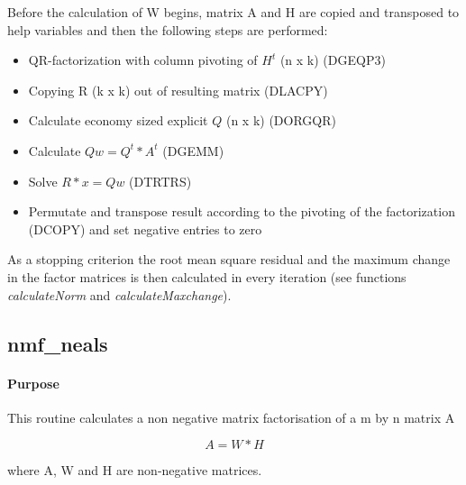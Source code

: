 \documentclass[a4paper,10pt]{scrartcl}
\begin{document}
					Before the calculation of W begins, matrix A and H are copied and 
					transposed to help variables and then the following steps are 
					performed:\newline
					
					\begin{itemize}
					 \item QR-factorization with column pivoting of $H^t$ (n x k) (DGEQP3)\newline
					 \item Copying R (k x k) out of resulting matrix (DLACPY)\newline
					 \item Calculate economy sized explicit $Q$ (n x k) (DORGQR)\newline	
					 \item Calculate $Qw = Q^t * A^t$ (DGEMM)\newline
					 \item Solve $R * x = Qw$ (DTRTRS)\newline
					 \item Permutate and transpose result according to the pivoting of the 
						factorization (DCOPY) and set negative entries to zero\newline
					\end{itemize}



					As a stopping criterion the root mean square residual and the maximum 
					change in the factor matrices is then calculated in every iteration (see
					functions \emph{calculateNorm} and \emph{calculateMaxchange}).\newline



		\subsection{nmf\_neals}

			\paragraph{Purpose}

					This routine calculates a non negative matrix factorisation of a m by n 
					matrix A\newline
					
					\begin{equation*}
						A = W * H
					\end{equation*}

 					where A, W and H are non-negative matrices.
\end{document}
